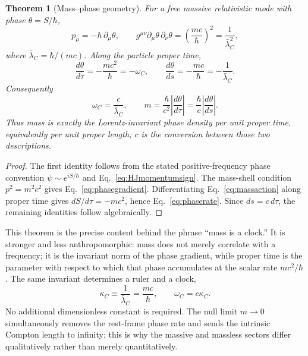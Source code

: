 \documentclass[11pt]{article}
\newtheorem{theorem}{Theorem}[section]
\theoremstyle{definition}\newtheorem{definition}[theorem]{Definition}
\theoremstyle{remark}\newtheorem{remark}[theorem]{Remark}\newtheorem{conjecture}[theorem]{Conjecture}
\begin{document}
\begin{theorem}[Mass--phase geometry]\label{thm:massphase}
For a free massive relativistic mode with phase $\theta=S/\hbar$,
\begin{equation}\label{eq:phasegradient}
 p_\mu=-\hbar\,\partial_\mu\theta,
 \qquad
 g^{\mu\nu}\partial_\mu\theta\,\partial_\nu\theta
 =\left(\frac{mc}{\hbar}\right)^2
 =\frac{1}{\bar\lambda_C^2},
\end{equation}
where $\bar\lambda_C=\hbar/(mc)$. Along the particle proper time,
\begin{equation}\label{eq:phaserate}
 \frac{d\theta}{d\tau}=-\frac{mc^2}{\hbar}=-\omega_C,
 \qquad
 \frac{d\theta}{ds}=-\frac{mc}{\hbar}=-\frac1{\bar\lambda_C}.
\end{equation}
Consequently
\begin{equation}\label{eq:massclockbridge}
 \boxed{\omega_C=\frac{c}{\bar\lambda_C}},
 \qquad
 \boxed{m=\frac{\hbar}{c^2}\left|\frac{d\theta}{d\tau}\right|}
 =\frac{\hbar}{c}\left|\frac{d\theta}{ds}\right|.
\end{equation}
Thus mass is exactly the Lorentz-invariant phase density per unit proper time, equivalently per unit proper length; $c$ is the conversion between those two descriptions.
\end{theorem}
\begin{proof}
The first identity follows from the stated positive-frequency phase convention $\psi\sim e^{iS/\hbar}$ and Eq.~\eqref{eq:HJmomentumsign}. The mass-shell condition $p^2=m^2c^2$ gives Eq.~\eqref{eq:phasegradient}. Differentiating Eq.~\eqref{eq:massaction} along proper time gives $dS/d\tau=-mc^2$, hence Eq.~\eqref{eq:phaserate}. Since $ds=c\,d\tau$, the remaining identities follow algebraically.
\end{proof}

This theorem is the precise content behind the phrase ``mass is a clock.'' It is stronger and less anthropomorphic: mass does not merely correlate with a frequency; it is the invariant norm of the phase gradient, while proper time is the parameter with respect to which that phase accumulates at the scalar rate $mc^2/\hbar$. The same invariant determines a ruler and a clock,
\begin{equation}
 \kappa_C\equiv\frac1{\bar\lambda_C}=\frac{mc}{\hbar},
 \qquad
 \omega_C=c\kappa_C.
\end{equation}
No additional dimensionless constant is required. The null limit $m\to0$ simultaneously removes the rest-frame phase rate and sends the intrinsic Compton length to infinity; this is why the massive and massless sectors differ qualitatively rather than merely quantitatively.
\end{document}
